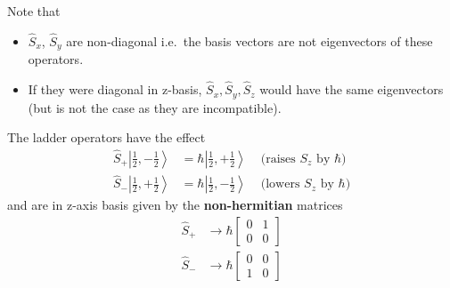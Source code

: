 Note that
\begin{itemize}
    \item $\widehat{S}_{x}$, $\widehat{S}_{y}$ are non-diagonal i.e.\ the basis vectors are not eigenvectors of these operators.
    \item If they were diagonal in z-basis, $\widehat{S}_{x},\widehat{S}_{y},\widehat{S}_{z}$ would have the same eigenvectors (but is not the case as they are incompatible).
\end{itemize}


The ladder operators have the effect
\begin{align*}
    \widehat{S}_{+}\left|\frac{1}{2},-\frac{1}{2}\right> & =\hbar\left|\frac{1}{2},+\frac{1}{2}\right> & \text{ (raises $S_z$ by $\hbar$)} \\
    \widehat{S}_{-}\left|\frac{1}{2},+\frac{1}{2}\right> & =\hbar\left|\frac{1}{2},-\frac{1}{2}\right> & \text{ (lowers $S_z$ by $\hbar$)}
\end{align*}
and are in z-axis basis given by the \textbf{non-hermitian} matrices
\begin{align*}
    \widehat{S}_{+} & \rightarrow \hbar\begin{bmatrix}
                                           0 & 1 \\
                                           0 & 0
                                       \end{bmatrix} \\
    \widehat{S}_{-} & \rightarrow \hbar\begin{bmatrix}
                                           0 & 0 \\
                                           1 & 0
                                       \end{bmatrix}
\end{align*}
